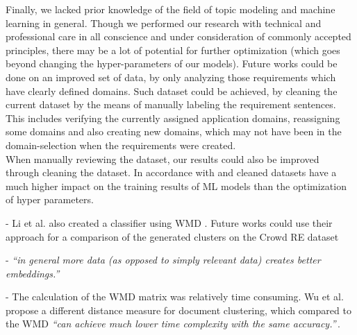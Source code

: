 Finally, we lacked prior knowledge of the field of topic modeling and machine learning in general. Though we performed our research with technical and professional care in all conscience and under consideration of commonly accepted principles, there may be a lot of potential for further optimization (which goes beyond changing the hyper-parameters of our models). Future works could be done on an improved set of data, by only analyzing those requirements which have clearly defined domains. Such dataset could be achieved, by cleaning the current \crowdre{} dataset by the means of manually labeling the requirement sentences. This includes verifying the currently assigned application domains, reassigning some domains and also creating new domains, which may not have been in the domain-selection when the requirements were created.\\

When manually reviewing the dataset, our results could also be improved through cleaning the dataset. In accordance with \cite{chu_data_2016} and \cite{krishnan_data_2016}  cleaned datasets have a much higher impact on the training results of ML models than the optimization of hyper parameters. 

- Li et al. also created a classifier using WMD \cite{li_classifying_2019}. Future works could use their approach for a comparison of the generated clusters on the Crowd RE dataset

- \textit{``in general more data (as opposed to simply relevant data) creates better embeddings.''}\,\cite{kusner_word_2015}

- The calculation of the WMD matrix was relatively time consuming. Wu et al. propose a different distance measure for document clustering, which compared to the WMD \textit{``can achieve much lower time complexity with the same accuracy.''}\,\cite{wu_topic_2017}.
\\[2cm]